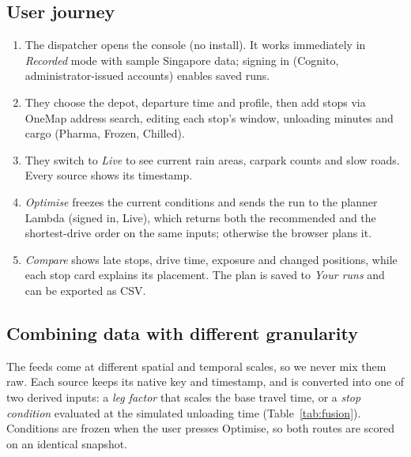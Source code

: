 \documentclass[10.5pt,a4paper]{article}
\begin{document}
\subsection{User journey}
\begin{enumerate}
\item The dispatcher opens the console (no install). It works immediately in \emph{Recorded} mode with sample Singapore
data; signing in (Cognito, administrator-issued accounts) enables saved runs.
\item They choose the depot, departure time and profile, then add stops via OneMap address search, editing each stop's
window, unloading minutes and cargo (Pharma, Frozen, Chilled).
\item They switch to \emph{Live} to see current rain areas, carpark counts and slow roads. Every source shows its timestamp.
\item \emph{Optimise} freezes the current conditions and sends the run to the planner Lambda (signed in, Live), which returns
both the recommended and the shortest-drive order on the same inputs; otherwise the browser plans it.
\item \emph{Compare} shows late stops, drive time, exposure and changed positions, while each stop card explains its placement.
The plan is saved to \emph{Your runs} and can be exported as CSV.
\end{enumerate}

\subsection{Combining data with different granularity}
The feeds come at different spatial and temporal scales, so we never mix them raw. Each source
keeps its native key and timestamp, and is converted into one of two derived inputs: a \emph{leg factor} that scales the base
travel time, or a \emph{stop condition} evaluated at the simulated unloading time (Table~\ref{tab:fusion}). Conditions are
frozen when the user presses Optimise, so both routes are scored on an identical snapshot.
\end{document}
